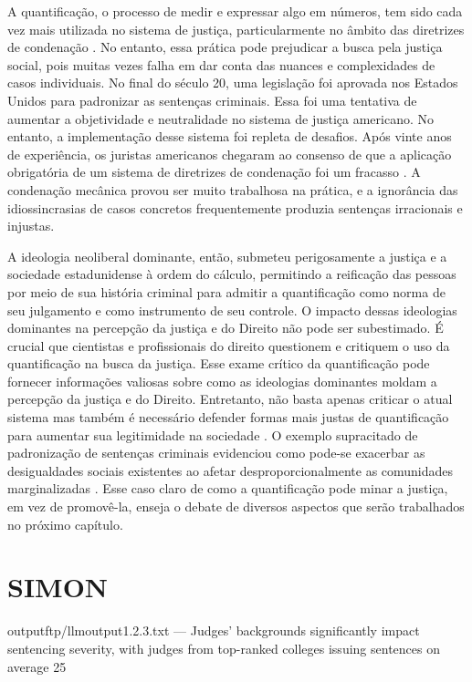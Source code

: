 A quantificação, o processo de medir e expressar algo em números, tem sido cada vez mais utilizada no sistema de justiça, particularmente no âmbito das diretrizes de condenação \cite{salais2016quantification}. No entanto, essa prática pode prejudicar a busca pela justiça social, pois muitas vezes falha em dar conta das nuances e complexidades de casos individuais. No final do século 20, uma legislação foi aprovada nos Estados Unidos para padronizar as sentenças criminais. Essa foi uma tentativa de aumentar a objetividade e neutralidade no sistema de justiça americano. No entanto, a implementação desse sistema foi repleta de desafios. Após vinte anos de experiência, os juristas americanos chegaram ao consenso de que a aplicação obrigatória de um sistema de diretrizes de condenação foi um fracasso \cite{espeland2008sociology}. A condenação mecânica provou ser muito trabalhosa na prática, e a ignorância das idiossincrasias de casos concretos frequentemente produzia sentenças irracionais e injustas.

A ideologia neoliberal dominante, então, submeteu perigosamente a justiça e a sociedade estadunidense à ordem do cálculo, permitindo a reificação das pessoas por meio de sua história criminal para admitir a quantificação como norma de seu julgamento e como instrumento de seu controle. O impacto dessas ideologias dominantes na percepção da justiça e do Direito não pode ser subestimado. É crucial que cientistas e profissionais do direito questionem e critiquem o uso da quantificação na busca da justiça. Esse exame crítico da quantificação pode fornecer informações valiosas sobre como as ideologias dominantes moldam a percepção da justiça e do Direito. Entretanto, não basta apenas criticar o atual sistema mas também é necessário defender formas mais justas de quantificação para aumentar sua legitimidade na sociedade \cite{camargo2022estado}. O exemplo supracitado de padronização de sentenças criminais evidenciou como pode-se exacerbar as desigualdades sociais existentes ao afetar desproporcionalmente as comunidades marginalizadas \cite{lynch2019narrative}. Esse caso claro de como a quantificação pode minar a justiça, em vez de promovê-la, enseja o debate de diversos aspectos que serão trabalhados no próximo capítulo.

\section{SIMON}

outputftp/llmoutput1.2.3.txt
---
Judges' backgrounds significantly impact sentencing severity, with judges from top-ranked colleges issuing sentences on average 25%

